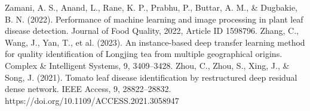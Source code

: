 	Zamani, A. S., Anand, L., Rane, K. P., Prabhu, P., Buttar, A. M., \& Dugbakie, B. N. (2022). Performance of machine learning and image processing in plant leaf disease detection. Journal of Food Quality, 2022, Article ID 1598796.
	Zhang, C., Wang, J., Yan, T., et al. (2023). An instance-based deep transfer learning method for quality identification of Longjing tea from multiple geographical origins. Complex \& Intelligent Systems, 9, 3409–3428.
	Zhou, C., Zhou, S., Xing, J., \& Song, J. (2021). Tomato leaf disease identification by restructured deep residual dense network. IEEE Access, 9, 28822–28832. https://doi.org/10.1109/ACCESS.2021.3058947

